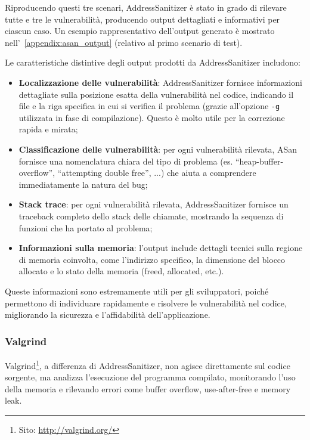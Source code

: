 Riproducendo questi tre scenari, AddressSanitizer è stato in grado di rilevare tutte
e tre le vulnerabilità, producendo output dettagliati e informativi per ciascun
caso. Un esempio rappresentativo dell'output generato è mostrato nell'~\autoref{appendix:asan_output}
(relativo al primo scenario di test).

Le caratteristiche distintive degli output prodotti da AddressSanitizer includono:
\begin{itemize}
  \item \textbf{Localizzazione delle vulnerabilità}: AddressSanitizer fornisce informazioni
    dettagliate sulla posizione esatta della vulnerabilità nel codice, indicando
    il file e la riga specifica in cui si verifica il problema (grazie all'opzione
    \texttt{-g} utilizzata in fase di compilazione). Questo è molto utile per la
    correzione rapida e mirata;

  \item \textbf{Classificazione delle vulnerabilità}: per ogni vulnerabilità rilevata,
    ASan fornisce una nomenclatura chiara del tipo di problema (es. ``heap-buffer-overflow'',
    ``attempting double free'', ...) che aiuta a comprendere immediatamente la natura
    del bug;

  \item \textbf{Stack trace}: per ogni vulnerabilità rilevata, AddressSanitizer
    fornisce un traceback completo dello stack delle chiamate, mostrando la sequenza
    di funzioni che ha portato al problema;

  \item \textbf{Informazioni sulla memoria}: l'output include dettagli tecnici sulla
    regione di memoria coinvolta, come l'indirizzo specifico, la dimensione del blocco
    allocato e lo stato della memoria (freed, allocated, etc.).
\end{itemize}

Queste informazioni sono estremamente utili per gli sviluppatori, poiché permettono
di individuare rapidamente e risolvere le vulnerabilità nel codice, migliorando
la sicurezza e l'affidabilità dell'applicazione.

\subsubsection*{Valgrind}
\label{subsubsec:valgrind} Valgrind\footnote{Sito: \url{http://valgrind.org/}},
a differenza di AddressSanitizer, non agisce direttamente sul codice sorgente,
ma analizza l'esecuzione del programma compilato, monitorando l'uso della memoria
e rilevando errori come buffer overflow, use-after-free e memory leak.

